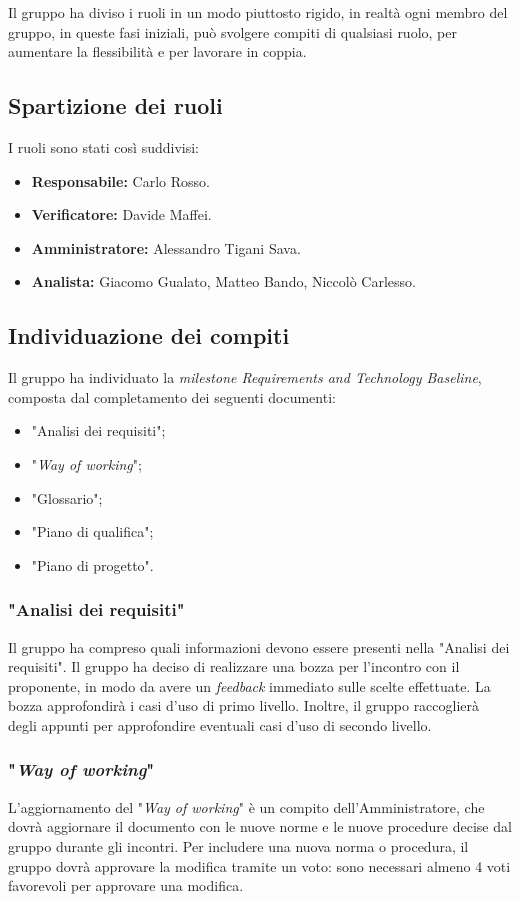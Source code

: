 Il gruppo ha diviso i ruoli in un modo piuttosto rigido, in realtà ogni membro
del gruppo, in queste fasi iniziali, può svolgere compiti di qualsiasi ruolo,
per aumentare la flessibilità e per lavorare in coppia.

\subsection{Spartizione dei ruoli}
I ruoli sono stati così suddivisi:
\begin{itemize}
	\item \textbf{Responsabile:} Carlo Rosso.
	\item \textbf{Verificatore:} Davide Maffei.
	\item \textbf{Amministratore:} Alessandro Tigani Sava.
	\item \textbf{Analista:} Giacomo Gualato, Matteo Bando, Niccolò Carlesso.
\end{itemize}

\subsection{Individuazione dei compiti}
Il gruppo ha individuato la  \textit{milestone Requirements and Technology
	Baseline}, composta dal completamento dei seguenti documenti:
\begin{itemize}
	\item "Analisi dei requisiti";
	\item "\textit{Way of working}";
	\item "Glossario";
	\item "Piano di qualifica";
	\item "Piano di progetto".
\end{itemize}

\subsubsection{"Analisi dei requisiti"}
Il gruppo ha compreso quali informazioni devono essere presenti nella "Analisi
dei requisiti". Il gruppo ha deciso di realizzare
una bozza per l'incontro con il proponente, in modo da avere un
\textit{feedback} immediato sulle scelte effettuate. La bozza approfondirà i
casi d'uso di primo livello. Inoltre, il gruppo raccoglierà degli appunti per
approfondire eventuali casi d'uso di secondo livello.

\subsubsection{"\textit{Way of working}"}
L'aggiornamento del "\textit{Way of working}" è un compito dell'Amministratore,
che dovrà aggiornare il documento con le nuove norme e le nuove procedure
decise dal gruppo durante gli incontri. Per includere una nuova norma o
procedura, il gruppo dovrà approvare la modifica tramite un voto: sono
necessari almeno 4 voti favorevoli per approvare una modifica.

